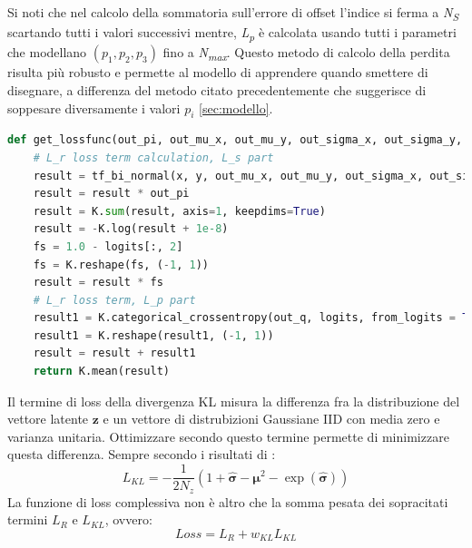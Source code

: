 Si noti che nel calcolo della sommatoria sull'errore di offset l'indice si ferma a \textit{N\textsubscript{S}} scartando tutti i valori successivi mentre, \textit{L\textsubscript{p}} è calcolata usando tutti i parametri che modellano $(p_1, p_2, p_3)$ fino a \textit{N\textsubscript{max}}. Questo metodo di calcolo della perdita risulta più robusto e permette al modello di apprendere quando smettere di disegnare, a differenza del metodo citato precedentemente che suggerisce di soppesare diversamente i valori $p_i$ \ref{sec:modello}.

\begin{minipage}{\linewidth}
\begin{lstlisting}[language = Python, frame = single, caption = {Implementazione in Keras del calcolo dell'errore di ricostruzione, suddiviso fra i termini dell'errore nell'offset $(L_s)$ e l'errore degli stati della penna $(L_p)$}, captionpos = b]
def get_lossfunc(out_pi, out_mu_x, out_mu_y, out_sigma_x, out_sigma_y, out_ro, out_q, x, y, logits):
    # L_r loss term calculation, L_s part
    result = tf_bi_normal(x, y, out_mu_x, out_mu_y, out_sigma_x, out_sigma_y, out_ro)
    result = result * out_pi
    result = K.sum(result, axis=1, keepdims=True)
    result = -K.log(result + 1e-8)
    fs = 1.0 - logits[:, 2]
    fs = K.reshape(fs, (-1, 1))
    result = result * fs
    # L_r loss term, L_p part
    result1 = K.categorical_crossentropy(out_q, logits, from_logits = True)
    result1 = K.reshape(result1, (-1, 1))
    result = result + result1
    return K.mean(result)
\end{lstlisting}
\end{minipage}

Il termine di loss della divergenza KL misura la differenza fra la distribuzione del vettore latente $\boldsymbol{z}$ e un vettore di distrubizioni Gaussiane IID con media zero e varianza unitaria. Ottimizzare secondo questo termine permette di minimizzare questa differenza. Sempre secondo i risultati di \cite{VAE}:
\begin{equation}
	\label{KL}
	L_{KL} = - \frac{1}{2N_z}(1 + \boldsymbol{\hat\sigma} - \boldsymbol{\mu}^2 - \exp(\boldsymbol{\hat\sigma}))
\end{equation}
La funzione di loss complessiva non è altro che la somma pesata dei sopracitati termini $L_R$ e $L_{KL}$, ovvero:
\begin{equation}
	\label{loss}
	Loss = L_R + w_{KL}L_{KL}
\end{equation}

